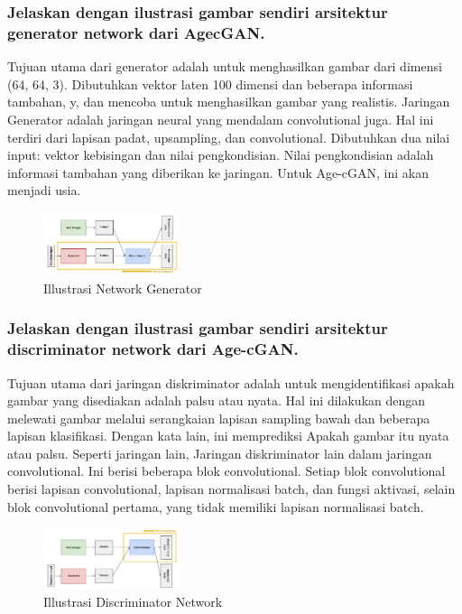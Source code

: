 \subsubsection{Jelaskan dengan ilustrasi gambar sendiri arsitektur generator network dari AgecGAN.}
\hfill \break
Tujuan utama dari generator adalah untuk menghasilkan gambar dari dimensi (64, 64, 3). Dibutuhkan vektor laten 100 dimensi dan beberapa informasi tambahan, y, dan mencoba untuk menghasilkan gambar yang realistis. Jaringan Generator adalah jaringan neural yang mendalam convolutional juga. Hal ini terdiri dari lapisan padat, upsampling, dan convolutional. Dibutuhkan dua nilai input: vektor kebisingan dan nilai pengkondisian. Nilai pengkondisian adalah informasi tambahan yang diberikan ke jaringan. Untuk Age-cGAN, ini akan menjadi usia. 
	\begin{figure}[H]
		\includegraphics[width=4cm]{figures/1174066/9/4.png}
		\centering
		\caption{Illustrasi Network Generator}
	\end{figure}

\subsubsection{Jelaskan dengan ilustrasi gambar sendiri arsitektur discriminator network dari Age-cGAN.}
\hfill \break
Tujuan utama dari jaringan diskriminator adalah untuk mengidentifikasi apakah gambar yang disediakan adalah palsu atau nyata. Hal ini dilakukan dengan melewati gambar melalui serangkaian lapisan sampling bawah dan beberapa lapisan klasifikasi. Dengan kata lain, ini memprediksi Apakah gambar itu nyata atau palsu. Seperti jaringan lain, Jaringan diskriminator lain dalam jaringan convolutional. Ini berisi beberapa blok convolutional. Setiap blok convolutional berisi lapisan convolutional, lapisan normalisasi batch, dan fungsi aktivasi, selain blok convolutional pertama, yang tidak memiliki lapisan normalisasi batch. 
	\begin{figure}[H]
		\includegraphics[width=4cm]{figures/1174066/9/5.png}
		\centering
		\caption{Illustrasi Discriminator Network}
	\end{figure}
	
